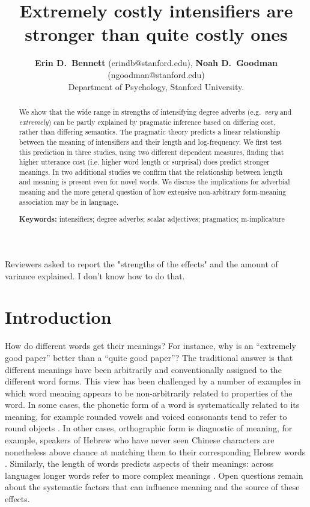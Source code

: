 \documentclass[10pt,letterpaper]{article}
\title{Extremely costly intensifiers are stronger than quite costly ones}
\author{{\large \bf Erin D.~Bennett} (erindb@stanford.edu), {\large \bf Noah D.~Goodman} (ngoodman@stanford.edu)\\
  Department of Psychology, Stanford University.}
\newcommand{\w}[1]{\emph{#1}}
\newcommand{\todo}[1]{{\color{red}#1}}
\begin{document}
\maketitle

\begin{abstract}

We show that the wide range in strengths of intensifying degree adverbs (e.g.~\w{very} and \w{extremely}) can be partly explained by pragmatic inference based on differing cost, rather than differing semantics.
The pragmatic theory predicts a linear relationship between the meaning of intensifiers and their length and log-frequency.
We first test this prediction in three studies, using two different dependent measures, finding that higher utterance cost (i.e. higher word length or surprisal) does predict stronger meanings.
In two additional studies we confirm that the relationship between length and meaning is present even for novel words.
We discuss the implications for adverbial meaning and the more general question of how extensive non-arbitrary form-meaning association may be in language.

\textbf{Keywords:} 
intensifiers; degree adverbs; scalar adjectives; pragmatics; m-implicature
\end{abstract}

\todo{Reviewers asked to report the "strengths of the effects" and the amount of variance explained. I don't know how to do that.}

\section{Introduction}

How do different words get their meanings?
For instance, why is an ``extremely good paper'' better than a ``quite good paper''?
The traditional answer \cite{de_saussure_nature_1916} is that different meanings have been arbitrarily and conventionally assigned to the different word forms.
This view has been challenged by a number of examples in which word meaning appears to be non-arbitrarily related to properties of the word.
In some cases, the phonetic form of a word is systematically related to its meaning, for example rounded vowels and voiced consonants tend to refer to round objects \cite{kohler_gestalt_1970, ramachandran_synaesthesiawindow_2001, holland_physiognomic_1964, davis_fitness_1961}.
In other cases, orthographic form is diagnostic of meaning, for example, speakers of Hebrew who have never seen Chinese characters are nonetheless above chance at matching them to their corresponding Hebrew words \cite{koriat_figural_1979}.
Similarly, the length of words predicts aspects of their meanings: across languages longer words refer to more complex meanings \cite{lewis_conceptual_2016}.
Open questions remain about the systematic factors that can influence meaning and the source of these effects.
\end{document}
